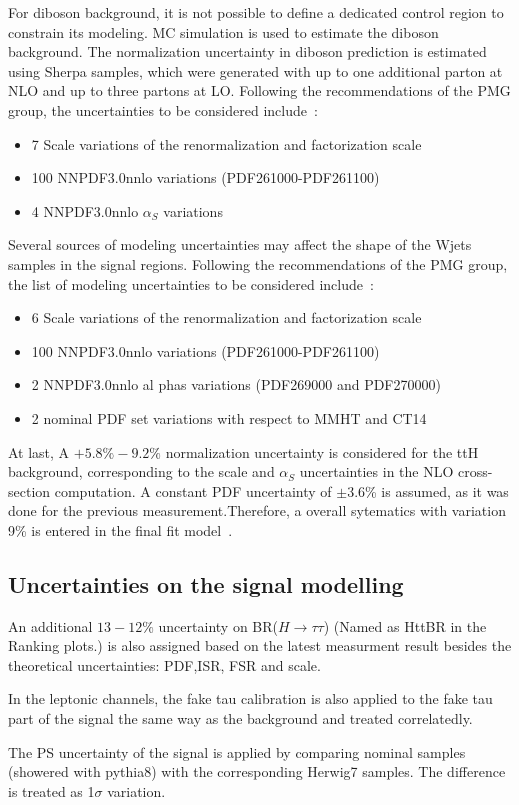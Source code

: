 For diboson background, it is not possible to define a dedicated control region to constrain its modeling. MC simulation is used to estimate the diboson background. The normalization uncertainty in diboson prediction is estimated using Sherpa samples, which were generated with up to one additional parton at NLO and up to three partons at LO. Following the recommendations of the PMG group, the uncertainties to be considered include~\cite{dibosonRes}: 
\begin{itemize}
	\item   7 Scale variations of the renormalization and factorization scale
	\item   100 NNPDF3.0nnlo variations (PDF261000-PDF261100)
	\item   4 NNPDF3.0nnlo $\alpha_{S}$ variations
\end{itemize}

Several sources of modeling uncertainties may affect the shape of the Wjets samples in the signal regions. Following the recommendations of the PMG group, the list of modeling uncertainties to be considered include~\cite{dibosonRes}:
\begin{itemize}
\item 6 Scale variations of the renormalization and factorization scale
\item 100 NNPDF3.0nnlo variations (PDF261000-PDF261100)
\item 2 NNPDF3.0nnlo al phas variations (PDF269000 and PDF270000)
\item 2 nominal PDF set variations with respect to MMHT and CT14
\end{itemize}

At last, A $+5.8\%-9.2\%$ normalization uncertainty is considered for the ttH background, corresponding to the scale and $\alpha_{S}$ uncertainties in the NLO cross-section computation. A constant PDF uncertainty of
$\pm3.6$\% is assumed, as it was done for the previous measurement.Therefore, a overall sytematics with variation 9\% is entered in the final fit model~\cite{ttZRun2}.

\subsection{Uncertainties on the signal modelling}

An additional $13-12\%$ uncertainty on BR($H\to\tau\tau$) (Named as HttBR in the Ranking plots.) is also assigned based on the latest measurment result \cite{HiggsBR} besides the theoretical uncertainties: PDF,ISR, FSR and scale.

In the leptonic channels, the fake tau calibration is also applied to the fake tau part of the signal the same way as the background and treated correlatedly.

The PS uncertainty of the signal is applied by comparing nominal samples (showered with pythia8) with the corresponding Herwig7 samples. The difference is treated as 1$\sigma$ variation.
